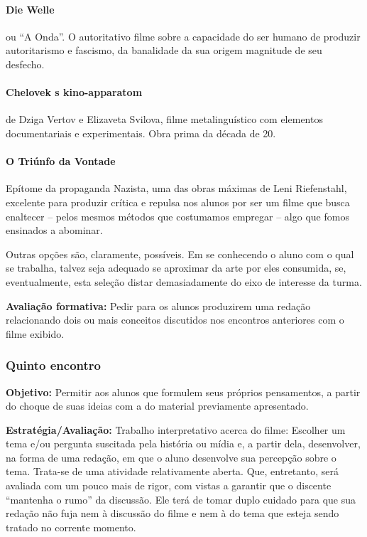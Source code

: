 \documentclass[12pt,a4paper]{article}
\newenvironment{citac}{
	\begin{addmargin}[4cm]{1em} \footnotesize}{\normalfont \end{addmargin}
}
\begin{document}
\begin{citac}
	\paragraph{Die Welle} ou ``A Onda''. O autoritativo 
		filme sobre a capacidade do ser humano de 
		produzir autoritarismo e fascismo, da banalidade
		da sua origem magnitude de seu desfecho.

	\paragraph{Chelovek s kino-apparatom} de Dziga Vertov e
		Elizaveta Svilova, filme metalinguístico com 
		elementos documentariais e experimentais. Obra 
		prima da década de 20.

	\paragraph{O Triúnfo da Vontade} Epítome da propaganda 
		Nazista, uma das obras máximas de Leni 
		Riefenstahl, excelente para produzir crítica e 
		repulsa nos alunos por ser um filme que busca 
		enaltecer -- pelos mesmos métodos que costumamos 
		empregar -- algo que fomos ensinados a abominar.
		
	Outras opções são, claramente, possíveis. Em se conhecendo 
	o aluno com o qual se trabalha, talvez seja adequado se 
	aproximar da arte por eles consumida, se, eventualmente, 
	esta seleção distar demasiadamente do eixo de interesse 
	da turma. 

	\textbf{Avaliação formativa:} Pedir para os alunos produzirem 
	uma redação relacionando dois ou mais conceitos discutidos nos 
	encontros anteriores com o filme exibido. 

	\subsubsection{Quinto encontro}
	
	\textbf{Objetivo:} Permitir aos alunos que formulem seus 
	próprios pensamentos, a partir do choque de suas ideias 
	com a do material previamente apresentado. 

	\textbf{Estratégia/Avaliação:}
	Trabalho interpretativo acerca do filme: 
	Escolher um tema e/ou pergunta suscitada pela história ou 
	mídia e, a partir dela, desenvolver, na forma de uma redação, 
	em que o aluno desenvolve sua percepção sobre o tema. Trata-se 
	de uma atividade relativamente aberta. Que, entretanto, será 
	avaliada com um pouco mais de rigor, com vistas a garantir 
	que o discente ``mantenha o rumo'' da discussão. Ele terá de 
	tomar duplo cuidado para que sua redação não fuja nem à 
	discussão do filme e nem à do tema que esteja sendo tratado 
	no corrente momento. 


\end{citac}
\end{document}
